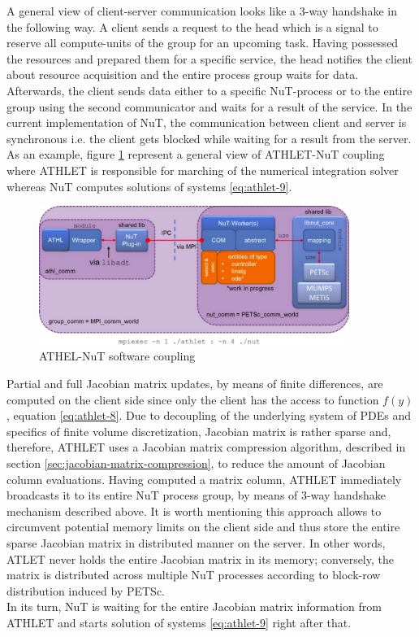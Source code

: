 A general view of client-server communication looks  like a 3-way handshake in the following way. A client sends a request to the head which is a signal to reserve all compute-units of the group for an upcoming task. Having possessed the resources and prepared them for a specific service, the head notifies the client about resource acquisition and the entire process group waits for data. Afterwards, the client sends data either to a specific NuT-process or to the entire group using the second communicator and waits for a result of the service. In the current implementation of NuT, the communication between client and server is synchronous i.e. the client gets blocked while waiting for a result from the server. \\


As an example, figure \ref{fig:introduction-athlet-nut-coupling} represent a general view of ATHLET-NuT coupling where ATHLET is responsible for marching of the numerical integration solver whereas NuT computes solutions of systems \ref{eq:athlet-9}.


\figpointer{\ref{fig:introduction-athlet-nut-coupling}}
\begin{figure}[htpb]
  \centering
  \includegraphics[width=0.9\textwidth]{figures/introduction-athlet-nut-coupling.png}
\caption{ATHEL-NuT software coupling}
\label{fig:introduction-athlet-nut-coupling}
\end{figure}


Partial and full Jacobian matrix updates, by means of finite differences, are computed on the client side since only the client has the access to function $f(y)$, equation \ref{eq:athlet-8}. Due to decoupling of the underlying system of PDEs and specifics of finite volume discretization, Jacobian matrix is rather sparse and, therefore, ATHLET uses a Jacobian matrix compression algorithm, described in section \ref{sec:jacobian-matrix-compression}, to reduce the amount of Jacobian column evaluations. Having computed a matrix column, ATHLET immediately broadcasts it to its entire NuT process group, by means of 3-way handshake mechanism described above. It is worth mentioning this approach allows to circumvent potential memory limits on the client side and thus store the entire sparse Jacobian matrix in distributed manner on the server. In other words, ATLET never holds the entire Jacobian matrix in its memory; conversely, the matrix is distributed across multiple NuT processes according to block-row distribution induced by PETSc.\\


In its turn, NuT is waiting for the entire Jacobian matrix information from ATHLET and starts solution of systems \ref{eq:athlet-9} right after that.\\


